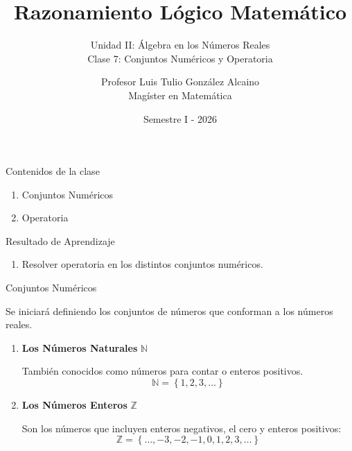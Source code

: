\documentclass[handout,10pt]{beamer}
\title[MAT-016]{Razonamiento Lógico Matemático}
\subtitle{Unidad II: Álgebra en los Números Reales\\
	Clase 7: Conjuntos Numéricos y Operatoria}
\author[]{Profesor Luis Tulio González Alcaino\\
	Magíster en Matemática}
\institute{Universidad Santo Tomás\\
	Departamento Ciencias Básicas - Talca}
\date{Semestre I - 2026}
\begin{document}
	
	\begin{frame}
		\titlepage
	\end{frame}
	
	\begin{frame}{Contenidos de la clase}
		\begin{enumerate}
			\item Conjuntos Numéricos
			\item Operatoria
		\end{enumerate}
	\end{frame}
	
	\begin{frame}{Resultado de Aprendizaje}
		\begin{enumerate}
			\item Resolver operatoria en los distintos conjuntos numéricos.
		\end{enumerate}
	\end{frame}
	
	\begin{frame}{Conjuntos Numéricos}
		\begin{block}{}
			Se iniciará definiendo los conjuntos de números que conforman a los números reales.
			
			\begin{enumerate}
				\item \textbf{Los Números Naturales} $\mathbb{N}$
				
				También conocidos como números para contar o enteros positivos.
				\[
				\mathbb{N}=\left\{1,2,3,\ldots\right\}
				\]
				
				\pause
				
				\item \textbf{Los Números Enteros} $\mathbb{Z}$
				
				Son los números que incluyen enteros negativos, el cero y enteros positivos:
				\[
				\mathbb{Z}=\left\{\ldots,-3,-2,-1,0,1,2,3,\ldots\right\}
				\]
			\end{enumerate}
		\end{block}
	\end{frame}
	
\end{document}
